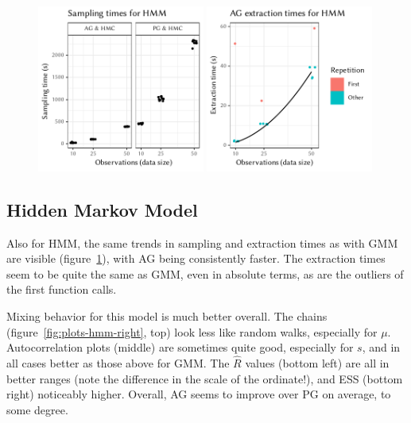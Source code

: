 \cleartoverso
\FloatBlock

\begin{figure}[t!]
  \centering
    \includegraphics[width=0.49\textwidth]{figures/HMM-sampling_times}
  \includegraphics[width=0.49\textwidth]{figures/HMM-compile_times}
  \caption{}
  \label{fig:plots-hmm-left}
\end{figure}

\subsection*{Hidden Markov Model}

Also for HMM, the same trends in sampling and extraction times as with GMM are visible
(figure~\ref{fig:plots-hmm-left}), with AG being consistently faster.  The extraction times seem to
be quite the same as GMM, even in absolute terms, as are the outliers of the first function calls.

Mixing behavior for this model is much better overall.  The chains
(figure~\ref{fig:plots-hmm-right}, top) look less like random walks, especially for \(\mu\).
Autocorrelation plots (middle) are sometimes quite good, especially for \(s\), and in all cases
better as those above for GMM.  The \(\widehat{R}\) values (bottom left) are all in better ranges
(note the difference in the scale of the ordinate!), and ESS (bottom right) noticeably higher.
Overall, AG seems to improve over PG on average, to some degree.

